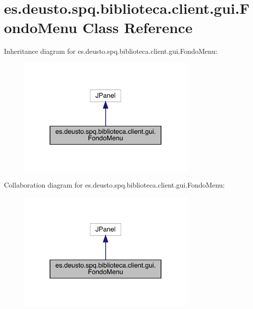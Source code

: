 \hypertarget{classes_1_1deusto_1_1spq_1_1biblioteca_1_1client_1_1gui_1_1_fondo_menu}{}\section{es.\+deusto.\+spq.\+biblioteca.\+client.\+gui.\+Fondo\+Menu Class Reference}
\label{classes_1_1deusto_1_1spq_1_1biblioteca_1_1client_1_1gui_1_1_fondo_menu}


Inheritance diagram for es.\+deusto.\+spq.\+biblioteca.\+client.\+gui.\+Fondo\+Menu\+:
\nopagebreak
\begin{figure}[H]
\begin{center}
\leavevmode
\includegraphics[width=248pt]{classes_1_1deusto_1_1spq_1_1biblioteca_1_1client_1_1gui_1_1_fondo_menu__inherit__graph}
\end{center}
\end{figure}


Collaboration diagram for es.\+deusto.\+spq.\+biblioteca.\+client.\+gui.\+Fondo\+Menu\+:
\nopagebreak
\begin{figure}[H]
\begin{center}
\leavevmode
\includegraphics[width=248pt]{classes_1_1deusto_1_1spq_1_1biblioteca_1_1client_1_1gui_1_1_fondo_menu__coll__graph}
\end{center}
\end{figure}
